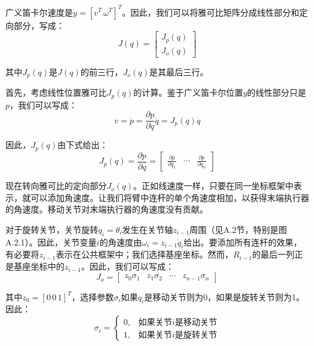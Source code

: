 \documentclass[UTF8,a4paper]{ctexart}
\begin{document}
广义笛卡尔速度是$\dot{y} = [v^T \, \omega^T]^T$。因此，我们可以将雅可比矩阵分成线性部分和定向部分，写成：
\begin{equation}
J(q) = \begin{bmatrix} J_p(q) \\ J_o(q) \end{bmatrix}
\tag{A.3.32}
\end{equation}

其中$J_p(q)$是$J(q)$的前三行，$J_o(q)$是其最后三行。

首先，考虑线性位置雅可比$J_p(q)$的计算。鉴于广义笛卡尔位置$y$的线性部分只是$p$，我们可以写成：
\begin{equation}
v = \dot{p} = \frac{\partial p}{\partial q}\dot{q} = J_p(q)\dot{q}
\tag{A.3.33}
\end{equation}

因此，$J_p(q)$由下式给出：
\begin{equation}
J_p(q) = \frac{\partial p}{\partial q} = \begin{bmatrix} \frac{\partial p}{\partial q_1} & \cdots & \frac{\partial p}{\partial q_n} \end{bmatrix}
\tag{A.3.34}
\end{equation}

现在转向雅可比的定向部分$J_o(q)$。正如线速度一样，只要在同一坐标框架中表示，就可以添加角速度。让我们将臂中连杆的单个角速度相加，以获得末端执行器的角速度。移动关节对末端执行器的角速度没有贡献。

对于旋转关节，关节旋转$q_i = \theta_i$发生在关节轴$z_{i-1}$周围（见A.2节，特别是图A.2.1）。因此，关节变量$i$的角速度由$\omega_i = z_{i-1}\dot{q}_i$给出。要添加所有连杆的效果，有必要将$z_{i-1}$表示在公共框架中；我们选择基座坐标。然而，$R_{i-1}$的最后一列正是基座坐标中的$z_{i-1}$。因此，我们可以写成：
\begin{equation}
J_o = \begin{bmatrix} z_0\sigma_1 & z_1\sigma_2 & \cdots & z_{n-1}\sigma_n \end{bmatrix}
\tag{A.3.35}
\end{equation}

其中$z_0 = [0 \, 0 \, 1]^T$，选择参数$\sigma_i$如果$q_i$是移动关节则为0，如果是旋转关节则为1。因此：
\begin{equation}
\sigma_i = \begin{cases} 0, & \text{如果关节}i\text{是移动关节} \\ 1, & \text{如果关节}i\text{是旋转关节} \end{cases}
\tag{A.3.36}
\end{equation}
\end{document}
